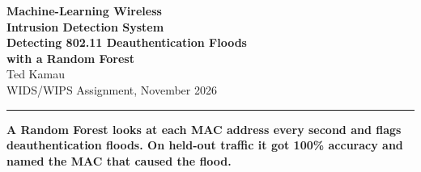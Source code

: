\documentclass[20pt]{extarticle}
\begin{document}
\begin{center}
{\color{navy}\fontsize{68}{76}\selectfont\bfseries Machine-Learning Wireless\\[1mm]
Intrusion Detection System}\\[4mm]
{\color{teal}\fontsize{34}{40}\selectfont\bfseries Detecting 802.11 Deauthentication Floods\\[1mm]
with a Random Forest}\\[4mm]
{\fontsize{26}{30}\selectfont Ted Kamau}\\[2mm]
{\fontsize{20}{24}\selectfont WIDS/WIPS Assignment, November 2026}
\end{center}

\vspace{-2mm}
{\color{navy}\rule{\linewidth}{2.2mm}}
\vspace{2mm}

\begin{tcolorbox}[colback=amber!18,colframe=amber,boxrule=1.2pt,arc=2mm,
  left=6mm,right=6mm,top=3mm,bottom=3mm]
{\fontsize{24}{28}\selectfont\bfseries A Random Forest looks at each MAC address every second and flags deauthentication floods. On held-out traffic it got 100\% accuracy and named the MAC that caused the flood.}
\end{tcolorbox}
\end{document}
